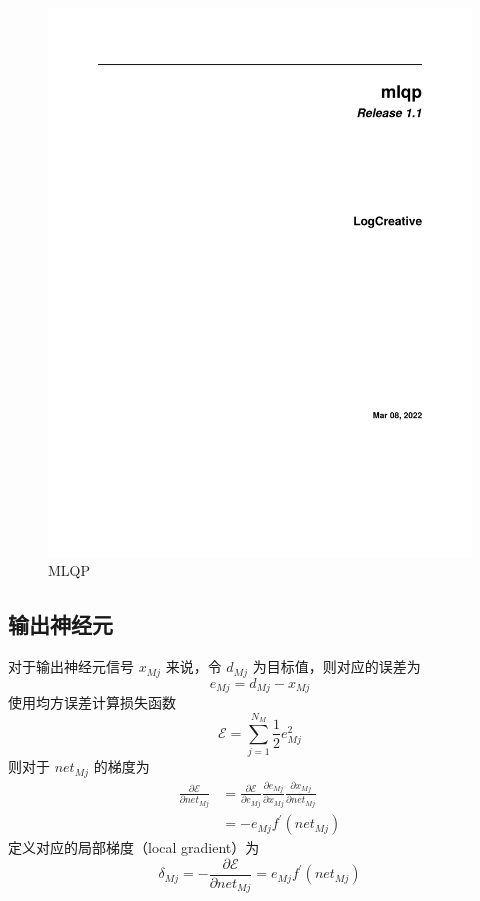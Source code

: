     \begin{figure}[h]
        \centering
        \includegraphics[height=0.25\textheight]{mlqp}
        \caption{MLQP}\label{fig:mlqp}
    \end{figure}

    \subsection{输出神经元}
        对于输出神经元信号 $x_{Mj}$ 来说，令 $d_{Mj}$ 为目标值，则对应的误差为
        \begin{equation*}
            e_{Mj} = d_{Mj} - x_{Mj}
        \end{equation*}
        使用均方误差计算损失函数
        \begin{equation}\label{eq:loss}
            \mathcal{E} = \sum_{j=1}^{N_{M}}\frac{1}{2}e_{Mj}^2
        \end{equation}
        则对于 $\mathit{net}_{Mj}$ 的梯度为
        \begin{align*}
            \frac{\partial\mathcal{E}}{\partial net_{Mj}} &= \frac{\partial\mathcal{E}}{\partial e_{Mj}}\frac{\partial e_{Mj}}{\partial x_{Mj}}\frac{\partial x_{Mj}}{\partial \mathit{net}_{Mj}} \\
            &= -e_{Mj}f^\prime(\mathit{net}_{Mj})
        \end{align*}
        定义对应的局部梯度（local gradient）为
        \begin{equation}\label{eq:outlocalgrad}
            \delta_{Mj} = -\frac{\partial\mathcal{E}}{\partial net_{Mj}} = e_{Mj}f^\prime(\mathit{net}_{Mj})
        \end{equation}
